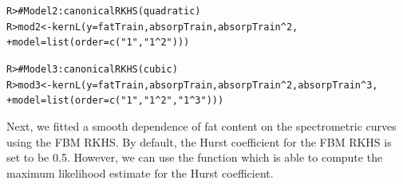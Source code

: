 \documentclass[a4paper,showframe,11pt]{report}\usepackage[]{graphicx}\usepackage[]{color}
\makeatletter
\newcommand{\hlnum}[1]{\textcolor[rgb]{0.063,0.58,0.627}{#1}}%
\newcommand{\hlstr}[1]{\textcolor[rgb]{0.063,0.58,0.627}{#1}}%
\newcommand{\hlcom}[1]{\textcolor[rgb]{0.588,0.588,0.588}{#1}}%
\newcommand{\hlopt}[1]{\textcolor[rgb]{0.196,0.196,0.196}{#1}}%
\newcommand{\hlstd}[1]{\textcolor[rgb]{0.196,0.196,0.196}{#1}}%
\newcommand{\hlkwb}[1]{\textcolor[rgb]{0.627,0,0.314}{#1}}%
\newcommand{\hlkwc}[1]{\textcolor[rgb]{0,0.631,0.314}{#1}}%
\newcommand{\hlkwd}[1]{\textcolor[rgb]{0.78,0.227,0.412}{#1}}%
\newenvironment{kframe}{%
 \def\at@end@of@kframe{}%
 \ifinner\ifhmode%
  \def\at@end@of@kframe{\end{minipage}}%
  \begin{minipage}{\columnwidth}%
 \fi\fi%
 \def\FrameCommand##1{\hskip\@totalleftmargin \hskip-\fboxsep
 \colorbox{shadecolor}{##1}\hskip-\fboxsep
     \hskip-\linewidth \hskip-\@totalleftmargin \hskip\columnwidth}%
 \MakeFramed {\advance\hsize-\width
   \@totalleftmargin\z@ \linewidth\hsize
   \@setminipage}}%
 {\par\unskip\endMakeFramed%
 \at@end@of@kframe}
\newenvironment{knitrout}{}{} %
\makeatother
\begin{document}
\begin{knitrout}
\color{fgcolor}\begin{kframe}
\begin{alltt}
\hlstd{R> }\hlcom{# Model 2: canonical RKHS (quadratic)}
\hlstd{R> }\hlstd{mod2} \hlkwb{<-} \hlkwd{kernL}\hlstd{(}\hlkwc{y} \hlstd{= fatTrain, absorpTrain, absorpTrain} \hlopt{^} \hlnum{2}\hlstd{,}
\hlstd{+  }              \hlkwc{model} \hlstd{=} \hlkwd{list}\hlstd{(}\hlkwc{order} \hlstd{=} \hlkwd{c}\hlstd{(}\hlstr{"1"}\hlstd{,} \hlstr{"1^2"}\hlstd{)))}
\end{alltt}
\end{kframe}
\end{knitrout}
\begin{knitrout}
\color{fgcolor}\begin{kframe}
\begin{alltt}
\hlstd{R> }\hlcom{# Model 3: canonical RKHS (cubic)}
\hlstd{R> }\hlstd{mod3} \hlkwb{<-} \hlkwd{kernL}\hlstd{(}\hlkwc{y} \hlstd{= fatTrain, absorpTrain, absorpTrain} \hlopt{^} \hlnum{2}\hlstd{, absorpTrain} \hlopt{^} \hlnum{3}\hlstd{,}
\hlstd{+  }              \hlkwc{model} \hlstd{=} \hlkwd{list}\hlstd{(}\hlkwc{order} \hlstd{=} \hlkwd{c}\hlstd{(}\hlstr{"1"}\hlstd{,} \hlstr{"1^2"}\hlstd{,} \hlstr{"1^3"}\hlstd{)))}
\end{alltt}
\end{kframe}
\end{knitrout}

Next, we fitted a smooth dependence of fat content on the spectrometric curves using the FBM RKHS. By default, the Hurst coefficient for the FBM RKHS is set to be 0.5. However, we can use the function  which is able to compute the maximum likelihood estimate for the Hurst coefficient.
\end{document}
